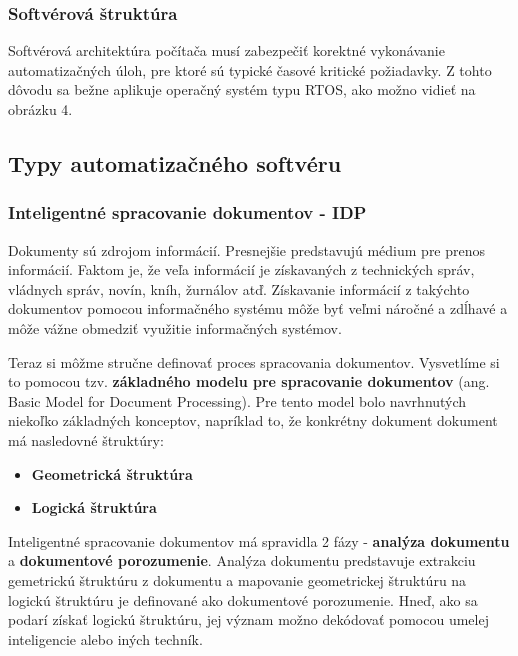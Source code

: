 \documentclass[twoside,slovak, a4paper]{article}
\begin{document}
\subsubsection*{Softvérová štruktúra}

Softvérová architektúra počítača musí zabezpečiť korektné vykonávanie automatizačných úloh, pre ktoré sú typické časové kritické požiadavky. Z  tohto dôvodu sa bežne aplikuje operačný systém typu RTOS, ako možno vidieť na obrázku 4.


\subsection{Typy automatizačného softvéru}

\subsubsection{Inteligentné spracovanie dokumentov - IDP}

Dokumenty sú zdrojom informácií. Presnejšie predstavujú médium pre prenos informácií. Faktom je, že veľa informácií je získavaných z technických správ, vládnych správ, novín, kníh, žurnálov atď. Získavanie informácií z takýchto dokumentov pomocou informačného systému môže byť veľmi náročné a zdĺhavé a môže vážne obmedziť využitie informačných systémov.\cite{TANG19961931}

Teraz si môžme stručne definovať proces spracovania dokumentov. Vysvetlíme si to pomocou tzv. \textbf{základného modelu pre spracovanie dokumentov} (ang. Basic Model for Document Processing). Pre tento model bolo navrhnutých niekoľko základných konceptov, napríklad to, že konkrétny dokument dokument má nasledovné štruktúry:

\begin{itemize}
    \item \textbf{Geometrická štruktúra}
    \item \textbf{Logická štruktúra}
\end{itemize}

Inteligentné spracovanie dokumentov má spravidla 2 fázy - \textbf{analýza dokumentu} a \textbf{dokumentové porozumenie}. Analýza dokumentu predstavuje extrakciu gemetrickú štruktúru z dokumentu a mapovanie geometrickej štruktúru na logickú štruktúru je definované ako dokumentové porozumenie. Hneď, ako sa podarí získať logickú štruktúru, jej význam možno dekódovať pomocou umelej inteligencie alebo iných techník\cite{TANG19961931}.
\end{document}

